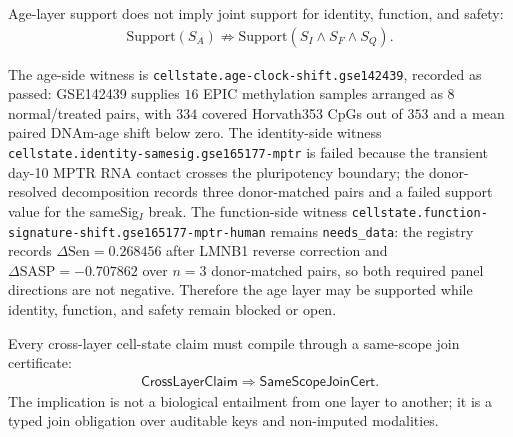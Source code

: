 \begin{proposition}
\label{prop:layer-local-support-non-promotion}
Age-layer support does not imply joint support for identity, function, and safety:
$$
\begin{aligned}
\mathrm{Support}(S_A)\not\Rightarrow
\mathrm{Support}(S_I\wedge S_F\wedge S_Q).
\end{aligned}
$$
\end{proposition}

The age-side witness is \texttt{cellstate.age-clock-shift.gse142439}, recorded as passed: GSE142439 supplies $16$ EPIC methylation samples arranged as $8$ normal/treated pairs, with $334$ covered Horvath353 CpGs out of $353$ and a mean paired DNAm-age shift below zero. The identity-side witness \texttt{cellstate.identity-samesig.gse165177-mptr} is failed because the transient day-10 MPTR RNA contact crosses the pluripotency boundary; the donor-resolved decomposition records three donor-matched pairs and a failed support value for the sameSig$_I$ break. The function-side witness \texttt{cellstate.function-signature-shift.gse165177-mptr-human} remains \texttt{needs\_data}: the registry records $\Delta\mathrm{Sen}=0.268456$ after LMNB1 reverse correction and $\Delta\mathrm{SASP}=-0.707862$ over $n=3$ donor-matched pairs, so both required panel directions are not negative. Therefore the age layer may be supported while identity, function, and safety remain blocked or open.

\begin{proposition}
\label{prop:same-scope-join}
Every cross-layer cell-state claim must compile through a same-scope join certificate:
$$
\begin{aligned}
\mathsf{CrossLayerClaim}\Rightarrow \mathsf{SameScopeJoinCert}.
\end{aligned}
$$
The implication is not a biological entailment from one layer to another; it is a typed join obligation over auditable keys and non-imputed modalities.
\end{proposition}

